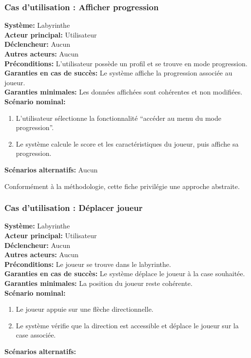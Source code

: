 \documentclass{butexFR}
\begin{document}
\subsubsection{Cas d'utilisation : Afficher progression}
\textbf{Système:} Labyrinthe\\
\textbf{Acteur principal:} Utilisateur\\
\textbf{Déclencheur:} Aucun\\
\textbf{Autres acteurs:} Aucun\\
\textbf{Préconditions:} L'utilisateur possède un profil et se trouve en mode progression.\\
\textbf{Garanties en cas de succès:} Le système affiche la progression associée au joueur.\\
\textbf{Garanties minimales:} Les données affichées sont cohérentes et non modifiées.\\
\textbf{Scénario nominal:}
\begin{enumerate}
    \item L'utilisateur sélectionne la fonctionnalité ``accéder au menu du mode progression''.
    \item Le système calcule le score et les caractéristiques du joueur, puis affiche sa progression.
\end{enumerate}
\textbf{Scénarios alternatifs:} Aucun

\smallskip
{}
Conformément à la méthodologie, cette fiche privilégie une approche abstraite.

\newpage

\subsubsection{Cas d'utilisation : Déplacer joueur}
\textbf{Système:} Labyrinthe\\
\textbf{Acteur principal:} Utilisateur\\
\textbf{Déclencheur:} Aucun\\
\textbf{Autres acteurs:} Aucun\\
\textbf{Préconditions:} Le joueur se trouve dans le labyrinthe.\\
\textbf{Garanties en cas de succès:} Le système déplace le joueur à la case souhaitée.\\
\textbf{Garanties minimales:} La position du joueur reste cohérente.\\
\textbf{Scénario nominal:}
\begin{enumerate}
    \item Le joueur appuie sur une flèche directionnelle.
    \item Le système vérifie que la direction est accessible et déplace le joueur sur la case associée.
\end{enumerate}
\textbf{Scénarios alternatifs:}
\end{document}

